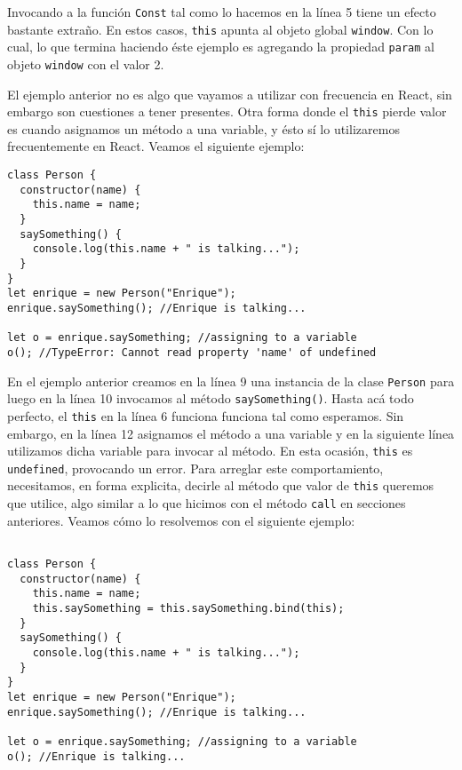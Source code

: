 \documentclass[a4paper, oneside, titlepage, 12pt]{paper}
\begin{document}
Invocando a la función \texttt{Const} tal como lo hacemos en la línea 5 tiene un efecto bastante extraño. En estos casos, \texttt{this} apunta al objeto global \texttt{window}. Con lo cual, lo que termina haciendo éste ejemplo es agregando la propiedad \texttt{param} al objeto \texttt{window} con el valor 2.
\newline

El ejemplo anterior no es algo que vayamos a utilizar con frecuencia en React, sin embargo son cuestiones a tener presentes. Otra forma donde el \texttt{this} pierde valor es cuando asignamos un método a una variable, y ésto sí lo utilizaremos frecuentemente en React. Veamos el siguiente ejemplo:

\begin{verbatim}
class Person {
  constructor(name) {
    this.name = name;
  }
  saySomething() {
    console.log(this.name + " is talking...");
  }
}
let enrique = new Person("Enrique");
enrique.saySomething(); //Enrique is talking...

let o = enrique.saySomething; //assigning to a variable
o(); //TypeError: Cannot read property 'name' of undefined
\end{verbatim}

En el ejemplo anterior creamos en la línea 9 una instancia de la clase \texttt{Person} para luego en la línea 10 invocamos al método \texttt{saySomething()}. Hasta acá todo perfecto, el \texttt{this} en la línea 6 funciona funciona tal como esperamos. Sin embargo, en la línea 12 asignamos el método a una variable y en la siguiente línea utilizamos dicha variable para invocar al método. En esta ocasión, \texttt{this} es \texttt{undefined}, provocando un error. Para arreglar este comportamiento, necesitamos, en forma explicita, decirle al método que valor de \texttt{this} queremos que utilice, algo similar a lo que hicimos con el método \texttt{call} en secciones anteriores. Veamos cómo lo resolvemos con el siguiente ejemplo:
 
\begin{verbatim}

class Person {
  constructor(name) {
    this.name = name;
    this.saySomething = this.saySomething.bind(this);    
  }
  saySomething() {
    console.log(this.name + " is talking...");
  }
}
let enrique = new Person("Enrique");
enrique.saySomething(); //Enrique is talking...

let o = enrique.saySomething; //assigning to a variable
o(); //Enrique is talking...
\end{verbatim}
\end{document}
